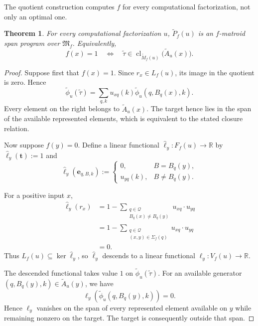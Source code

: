 \documentclass[11pt]{article}
\numberwithin{equation}{section}
\newtheorem{theorem}[definition]{Theorem}
\theoremstyle{remark}
\newcommand{\cl}{\operatorname{cl}}
\begin{document}
The quotient construction computes $f$ for every computational
factorization, not only an optimal one.

\begin{theorem}
\label{thm:quotient-normal-form-correct}
For every computational factorization $u$,
$\widetilde P_f(u)$ is an $f$-matroid span program over
$\mathfrak M_f$. Equivalently,
\begin{equation}
    f(x)=1
    \quad\Longleftrightarrow\quad
    \widetilde\tau
    \in
    \cl_{\widetilde M_f(u)}
    \bigl(\widetilde A_u(x)\bigr).
\end{equation}
\end{theorem}

\begin{proof}
Suppose first that $f(x)=1$. Since $r_x\in L_f(u)$, its image in the
quotient is zero. Hence
\begin{equation}
    \widetilde\phi_u(\widetilde\tau)
    =
    \sum_{q,k}
        u_{xq}(k)
        \widetilde\phi_u(q,B_q(x),k).
\end{equation}
Every element on the right belongs to $\widetilde A_u(x)$. The target
hence lies in the span of the available represented elements, which is
equivalent to the stated closure relation.

Now suppose $f(y)=0$. Define a linear functional
$\widehat\ell_y:F_f(u)\to\mathbb R$ by
$\widehat\ell_y(\mathbf t):=1$ and
\begin{equation}
    \widehat\ell_y(\mathbf e_{q,B,k})
    :=
    \begin{cases}
        0,&B=B_q(y),\\
        u_{yq}(k),&B\neq B_q(y).
    \end{cases}
\end{equation}

For a positive input $x$,
\begin{equation}
\begin{aligned}
    \widehat\ell_y(r_x)
    &=
    1-
    \sum_{\substack{q\in\mathcal Q\\
                    B_q(x)\neq B_q(y)}}
        u_{xq}\mathbin{\cdot}u_{yq}\\
    &=
    1-
    \sum_{\substack{q\in\mathcal Q\\
                    (x,y)\in\Sigma_f(q)}}
        u_{xq}\mathbin{\cdot}u_{yq}\\
    &=
    0.
\end{aligned}
\end{equation}
Thus $L_f(u)\subseteq\ker\widehat\ell_y$, so
$\widehat\ell_y$ descends to a linear functional
$\ell_y:V_f(u)\to\mathbb R$.

The descended functional takes value $1$ on
$\widetilde\phi_u(\widetilde\tau)$. For an available generator
$(q,B_q(y),k)\in\widetilde A_u(y)$, we have
\begin{equation}
    \ell_y(\widetilde\phi_u(q,B_q(y),k))=0.
\end{equation}
Hence $\ell_y$ vanishes on the span of every represented element available
on $y$ while remaining nonzero on the target. The target is consequently
outside that span.
\end{proof}
\end{document}
